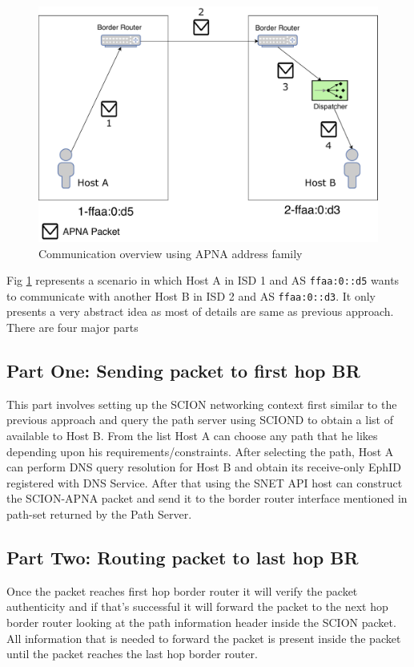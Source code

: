 \begin{figure}[th!!]
\centering
\includegraphics[scale=0.5]{Figures/address_family_comm.pdf}
\decoRule
\caption[APNA Service Incoming Packet]{Communication overview using APNA address family}
\label{fig:apna_address_comm}
\end{figure}
Fig \ref{fig:apna_address_comm} represents a scenario in which Host A in ISD 1 and AS \texttt{ffaa:0::d5} wants to communicate with another Host B in ISD 2 and AS \texttt{ffaa:0::d3}. 
It only presents a very abstract idea as most of details are same as previous approach.
There are four major parts

\subsection{Part One: Sending packet to first hop BR }
This part involves setting up the SCION networking context first similar to the previous approach and query the path server using SCIOND to obtain a list of available to Host B. From the list Host A can choose any path that he likes depending upon his requirements/constraints. After selecting the path, Host A can perform DNS query resolution for Host B and obtain its receive-only EphID registered with DNS Service. After that using the SNET API host can construct the SCION-APNA packet and send it to the border router interface mentioned in path-set returned by the Path Server.

\subsection{Part Two: Routing packet to last hop BR}
Once the packet reaches first hop border router it will verify the packet authenticity and if that's successful it will forward the packet to the next hop border router looking at the path information header inside the SCION packet. All information that is needed to forward the packet is present inside the packet until the packet reaches the last hop border router.

